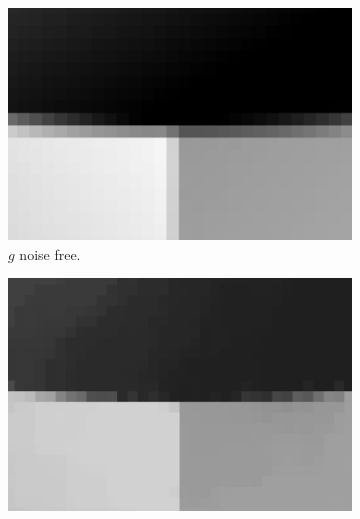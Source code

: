 \documentclass[abstracton]{scrreprt}
\begin{document}
            \begin{figure}[!ht]
                \centering
                \begin{subfigure}[b]{0.29\textwidth}
                    \includegraphics[width=\textwidth]{img/zoomed/synth_zoomed.png}
                    \caption{$g$ noise free.}
                \end{subfigure}
                \begin{subfigure}[b]{0.29\textwidth}
                    \includegraphics[width=\textwidth]{img/zoomed/gauss_noise_tvl1_zoomed.png}

\end{subfigure}
\end{figure}
\end{document}
